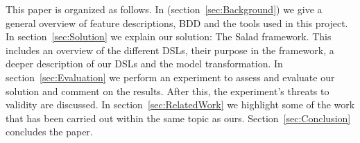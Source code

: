 This paper is organized as follows.
In (section~\ref{sec:Background}) we give a general overview of feature descriptions, BDD and the tools used in this project. 
In section~\ref{sec:Solution} we explain our solution: The Salad framework.
This includes an overview of the different DSLs, their purpose in the framework, a deeper description of our DSLs and the model transformation.
In section~\ref{sec:Evaluation} we perform an experiment to assess and evaluate our solution and comment on the results.
After this, the experiment's threats to validity are discussed.
In section~\ref{sec:RelatedWork} we highlight some of the work that has been carried out within the same topic as ours.
Section~\ref{sec:Conclusion} concludes the paper.


